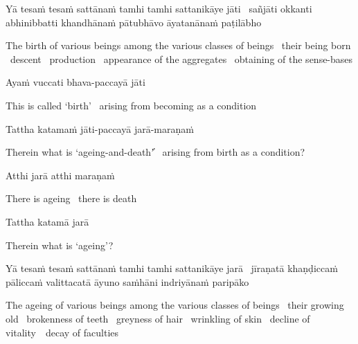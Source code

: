 \ifbfive\clearpage\fi
\ifafive\clearpage\fi

\begin{pali-hang}
  Yā tesaṁ tesaṁ sattānaṁ tamhi tamhi sattanikāye jāti \breathmark\ sañjāti okkanti abhinibbatti khandhānaṁ pātubhāvo āyatanānaṁ paṭilābho\makeatletter\hyperlink{endnote83-appendix}\makeatother
\end{pali-hang}

\begin{english-hang-verses}
  The birth of various beings among the various classes of beings \breathmark\ their being born \breathmark\ descent \breathmark\ production \breathmark\ appearance of the aggregates \breathmark\ obtaining of the sense-bases
\end{english-hang-verses}

Ayaṁ vuccati bhava-paccayā jāti

\begin{english-hang}
  This is called `birth' \breathmark\ arising from becoming as a condition
\end{english-hang}

Tattha katamaṁ jāti-paccayā jarā-maraṇaṁ

\begin{english-hang}
  Therein what is `ageing-and-death'̓ \breathmark\ arising from birth as a condition?
\end{english-hang}

Atthi jarā atthi maraṇaṁ

\begin{english}
  There is ageing \breathmark\ there is death
\end{english}

Tattha katamā jarā

\begin{english}
  Therein what is `ageing'?
\end{english}

\begin{pali-hang}
  Yā tesaṁ tesaṁ sattānaṁ tamhi tamhi sattanikāye jarā \breathmark\ jīraṇatā khaṇḍiccaṁ pāliccaṁ valittacatā āyuno saṁhāni indriyānaṁ paripāko
\end{pali-hang}

\begin{english-hang-verses}
  The ageing of various beings among the various classes of beings \breathmark\ their growing old \breathmark\ brokenness of teeth \breathmark\ greyness of hair \breathmark\ wrinkling of skin \breathmark\ decline of \mbox{vitality}~\breathmark\ decay of faculties
\end{english-hang-verses}

